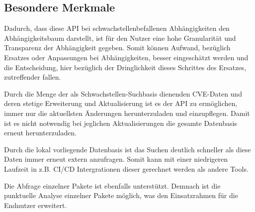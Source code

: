 \subsection{Besondere Merkmale} \label{sec:Besondere Merkmale}
    Dadurch, dass diese \ac{API} bei schwachstellenbefallenen Abhängigkeiten den Abhängigkeitsbaum darstellt, ist für den Nutzer eine hohe Granularität und Transparenz der Abhängigkeit gegeben.
    Somit können Aufwand, bezüglich Ersatzes oder Anpassungen bei Abhängigkeiten, besser eingeschätzt werden und die Entscheidung, hier bezüglich der Dringlichkeit dieses Schrittes des Ersatzes, zutreffender fallen.

    Durch die Menge der als Schwachstellen-Suchbasis dienenden \ac{CVE}-Daten und deren stetige Erweiterung und Aktualisierung ist es der \ac{API} zu ermöglichen, immer nur die aktuellsten Änderungen herunterzuladen und einzupflegen.
    Damit ist es nicht notwendig bei jeglichen Aktualisierungen die gesamte Datenbasis erneut herunterzuladen.

    Durch die lokal vorliegende Datenbasis ist das Suchen deutlich schneller als diese Daten immer erneut extern anzufragen.
    Somit kann mit einer niedrigeren Laufzeit in z.B. CI/CD Intergrationen dieser gerechnet werden als andere Tools.

    Die Abfrage einzelner Pakete ist ebenfalls unterstützt.
    Demnach ist die punktuelle Analyse einzelner Pakete möglich, was den Einsatzrahmen für die Endnutzer erweitert.
